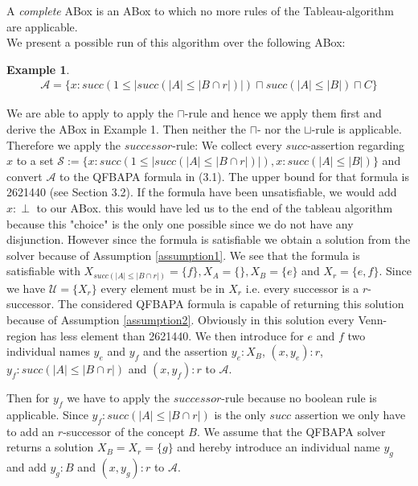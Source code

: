 \documentclass{book}
\theoremstyle{break}
\theoremstyle{definition}
\newtheorem{ex}{Example}
\begin{document}
A \textit{complete} ABox is an ABox to which no more rules of the Tableau-algorithm are applicable.\\
We present a possible run of this algorithm over the following ABox:
\begin{ex}
\begin{align*}
\mathcal{A}=\{x:succ(1\leq|succ(|A|\leq|B\cap r|)|)\sqcap succ(|A|\leq |B|)\sqcap C\}
\end{align*}
\end{ex}
We are able to apply to apply the $\sqcap$-rule and hence we apply them first and derive the ABox in Example 1. Then neither the $\sqcap$- nor the $\sqcup$-rule is applicable. Therefore we apply the $successor$-rule: We collect every $succ$-assertion regarding $x$ to a set $\mathcal{S}:=\{x:succ(1\leq|succ(|A|\leq|B\cap r|)|), x:succ(|A|\leq |B|)\}$ and convert $\mathcal{A}$ to the QFBAPA formula in (3.1). The upper bound for that formula is 2621440 (see Section 3.2). If the formula have been unsatisfiable, we would add $x:\perp$ to our ABox. this would have led us to the end of the tableau algorithm because this "choice" is the only one possible since we do not have any disjunction. However since the formula is satisfiable we obtain a solution from the solver because of Assumption \ref{assumption1}. We see that the formula is satisfiable with $X_{succ(|A|\leq |B\cap r|)}=\{f\},X_A=\{\},X_B=\{e\}$ and $X_r=\{e,f\}$. Since we have $\mathcal{U}=\{X_r\}$ every element must be in $X_r$ i.e. every successor is a $r$-successor. The considered QFBAPA formula is capable of returning this solution because of Assumption \ref{assumption2}. Obviously in this solution every Venn-region has less element than 2621440. We then introduce for $e$ and $f$ two individual names $y_e$ and $y_f$ and the assertion $y_e:X_B$, $(x,y_e):r$, $y_f:succ(|A|\leq|B\cap r|)$ and $(x,y_f):r$ to $\mathcal{A}$. 
\begin{figure}[H]
\centering
{}
\end{figure}
Then for $y_f$ we have to apply the $successor$-rule because no boolean rule is applicable. Since $y_f:succ(|A|\leq |B\cap r|)$ is the only $succ$ assertion we only have to add an $r$-successor of the concept $B$. We assume that the QFBAPA solver returns a solution $X_B=X_r=\{g\}$ and hereby introduce an individual name $y_g$ and add $y_g:B$ and $(x,y_g):r$ to $\mathcal{A}$.
\end{document}
